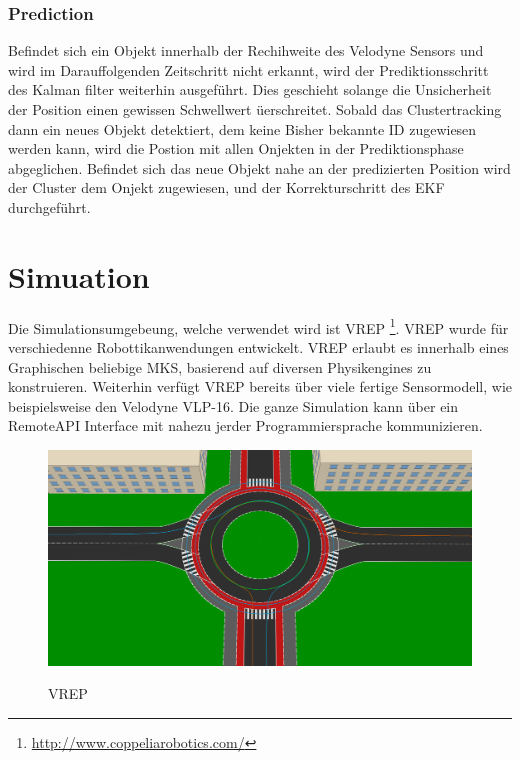 \documentclass[11pt,oneside,openright]{mpreport}
\begin{document}
\subsubsection{Prediction}
Befindet sich ein Objekt innerhalb der Rechihweite des Velodyne Sensors und wird im Darauffolgenden Zeitschritt nicht erkannt,
wird der Prediktionsschritt des Kalman filter weiterhin ausgeführt. Dies geschieht solange die Unsicherheit der Position einen gewissen Schwellwert üerschreitet.
Sobald das Clustertracking dann ein neues Objekt detektiert, dem keine Bisher bekannte ID zugewiesen werden kann, wird die Postion mit allen Onjekten in der Prediktionsphase
abgeglichen. Befindet sich das neue Objekt nahe an der predizierten Position wird der Cluster dem Onjekt zugewiesen, und der Korrekturschritt des EKF durchgeführt.



\section{Simuation}
Die Simulationsumgebeung, welche verwendet wird ist VREP \footnote{\url{http://www.coppeliarobotics.com/}}. VREP wurde für verschiedenne Robottikanwendungen entwickelt.
VREP erlaubt es innerhalb eines Graphischen beliebige \ac{MKS}, basierend auf diversen Physikengines zu konstruieren. Weiterhin verfügt VREP bereits über
viele fertige Sensormodell, wie beispielsweise den Velodyne VLP-16. Die ganze Simulation kann über ein RemoteAPI Interface mit nahezu jerder Programmiersprache kommunizieren.

\begin{figure}[!ht]
\caption{VREP}
\includegraphics[width=\textwidth]{bilder/path.png}
\label{vrep}
\end{figure}
\end{document}
